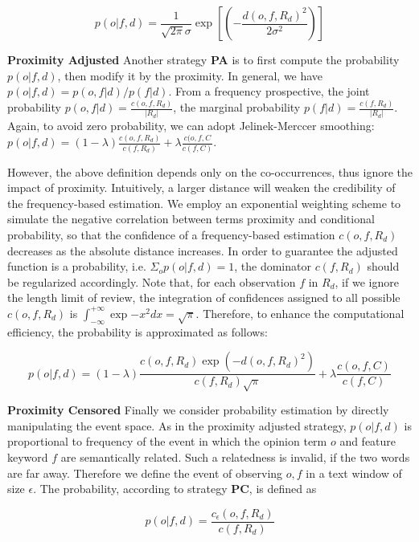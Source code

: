\documentclass[preprint]{elsarticle}
\begin{document}
\begin{equation}
p(o|f,d)=\frac{1}{\sqrt{2\pi}\sigma}\exp[(-\frac{d(o,f,R_d)^2}{2\sigma^2})]
\label{equ:parameterized}
\end{equation}

\textbf{Proximity Adjusted} Another strategy \textbf{PA} is to first compute the probability $p(o|f,d)$, then modify it by the proximity. In general, we have $p(o|f,d)=p(o,f|d)/p(f|d)$. From a frequency prospective, the joint probability $p(o,f|d)=\frac{c(o,f,R_d)}{|R_d|}$, the marginal probability $p(f|d)=\frac{c(f,R_d)}{|R_d|}$. Again, to avoid zero probability, we can adopt Jelinek-Merccer smoothing: $p(o|f,d)=(1-\lambda)\frac{c(o,f,R_d)}{c(f,R_d)}+\lambda \frac{c(o,f,C}{c(f,C)}$.

However, the above definition depends only on the co-occurrences, thus ignore the impact of proximity. Intuitively, a larger distance will weaken the credibility of the frequency-based estimation. We employ an exponential weighting scheme to simulate the negative correlation between terms proximity and conditional probability, so that the confidence of a frequency-based estimation $c(o,f,R_d)$ decreases as the absolute distance increases. In order to guarantee the adjusted function is a probability, i.e. $\Sigma_o p(o|f,d)=1$, the dominator $c(f,R_d)$ should be regularized accordingly. Note that, for each observation $f$ in $R_d$, if we ignore the length limit of review, the integration of confidences assigned to all possible $c(o,f,R_d)$ is $\int_{-\infty}^{+\infty}\exp{-x^2}dx=\sqrt{\pi}$. Therefore, to enhance the computational efficiency, the probability is approximated as follows:

\begin{equation}
p(o|f,d)=(1-\lambda)\frac{c(o,f,R_d)\exp{(-{d(o,f,R_d)}^2)}}{c(f,R_d)\sqrt{\pi}}+\lambda \frac{c(o,f,C)}{c(f,C)}
\label{equ:adjusted}
\end{equation}


\textbf{Proximity Censored} Finally we consider probability estimation by directly manipulating the event space. As in the proximity adjusted strategy, $p(o|f,d)$ is proportional to frequency of the event in which the opinion term $o$ and feature keyword $f$ are semantically related. Such a relatedness is invalid, if the two words are far away. Therefore we define the event of observing $o,f$ in a text window of size $\epsilon$. The probability, according to strategy \textbf{PC}, is defined as

\begin{equation}
p(o|f,d)=\frac{c_\epsilon(o,f,R_d)}{ c(f,R_d)}
\label{equ:cencored}
\end{equation}
\end{document}
